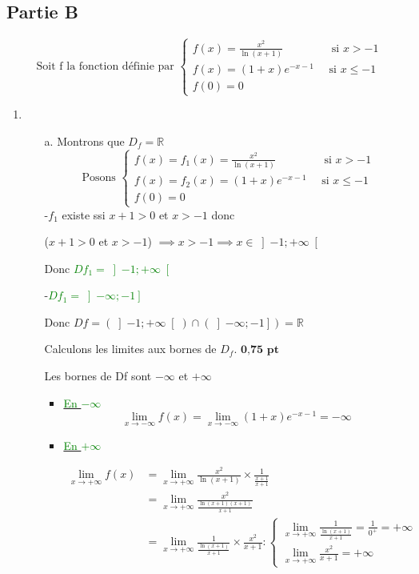\documentclass[12pt]{article}
\begin{document}
\subsection*{\centering Partie B}
$$
 \text{ Soit f la fonction définie par } 
\begin{cases}
f(x)=\frac{x^{2}}{\ln(x+1)}\quad\quad\quad\quad \text{ si } x>-1\\
f(x)=(1+x)e^{-x-1} \quad\text{ si } x\leq -1\\
f(0)=0
\end{cases}
$$
\begin{enumerate}
\item
\begin{enumerate}
\item[a.] Montrons que $D_{f}=\mathbb{R}$
$$
 \text{ Posons } 
\begin{cases}
f(x)=f_{1}(x)=\frac{x^{2}}{\ln(x+1)}\quad\quad\quad\quad \text{ si } x>-1\\
f(x)=f_{2}(x)=(1+x)e^{-x-1} \quad\text{ si } x\leq -1\\
f(0)=0
\end{cases}
$$
-$f_{1}$ existe ssi $x+1>0$ et $x>-1$ donc

($x+1>0$ et $x>-1$) $ \implies x>-1\implies x \in \left]-1;+\infty \right[$

Donc \textcolor{green}{$Df_{1}=\left]-1;+\infty \right[$}

-\textcolor{green}{$Df_{1}=\left]-\infty; -1\right]$}

Donc $Df=\left( \left]-1;+\infty \right[ \right)  \cap \left( \left]-\infty; -1\right] \right) =\mathbb{R} $

\textcolor{green}{}

Calculons les limites aux bornes de $D_{f}$. $\textbf{0,75 pt}$

Les bornes de Df sont $-\infty$ et $+\infty$
\begin{itemize}
\item \underline{\textcolor{green}{En $-\infty$}}
$$
\lim_{x \to -\infty}f(x)=\lim_{x \to -\infty}(1+x)e^{-x-1}=-\infty
$$
\begin{center}
\textcolor{green}{}
\end{center}

\item \underline{\textcolor{green}{En $+\infty$}}

\begin{align*}
\lim_{x \to +\infty}f(x)&=\lim_{x \to +\infty}\frac{x^{2}}{\ln(x+1)}\times \frac{1}{\frac{x+1}{x+1}}\\
&=\lim_{x \to +\infty}\frac{x^{2}}{\frac{\ln(x+1)(x+1)}{x+1}}\\
&=\lim_{x \to +\infty}\frac{1}{\frac{\ln(x+1)}{x+1}}\times\frac{x^{2}}{x+1}:
\begin{cases}
\lim_{x \to +\infty}\frac{1}{\frac{\ln(x+1)}{x+1}}=\frac{1}{0^{+}}=+\infty\\
\lim_{x \to +\infty}\frac{x^{2}}{x+1}=+\infty
\end{cases}
\end{align*}


\end{itemize}
\end{enumerate}
\end{enumerate}
\end{document}
